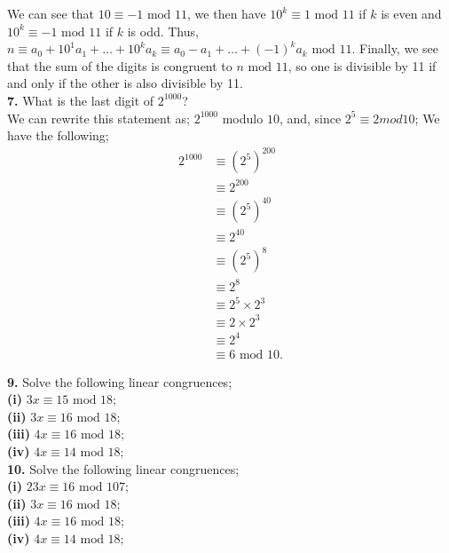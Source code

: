 \documentclass[paper=letter, fontsize=11pt]{scrartcl} %
\begin{document}
We can see that $10 \equiv -1 \text{ mod } 11$, we then have $10^k \equiv 1 \text{ mod } 11$
if $k$ is even and $10^k \equiv -1 \text{ mod } 11$ if $k$ is odd.
Thus, $n \equiv a_0 + 10^1 a_1 + \dots + 10^k a_k \equiv a_0 - a_1 + \dots + (-1)^k a_k 
\text{ mod } 11$.
Finally, we see that the sum of the digits is congruent to $n \text{ mod } 11$, so one is
divisible by 11 if and only if the other is also divisible by 11.
\\

\textbf{7.} What is the last digit of $2^{1000}$?
\\
We can rewrite this statement as; $2^1000$ modulo $10$, and, since $2^5 \equiv 2 mod 10$;
We have the following;
\begin{align*}
    2^1000 &\equiv (2^5)^{200} \\
    &\equiv 2^{200} \\
    &\equiv (2^5)^{40} \\
    &\equiv 2^{40} \\
    &\equiv (2^5)^8 \\
    &\equiv 2^8 \\
    &\equiv 2^5 \times 2^3 \\
    &\equiv 2 \times 2^3 \\
    &\equiv 2^4 \\
    &\equiv 6 \text{ mod } 10.
\end{align*}

\textbf{9.} Solve the following linear congruences; \\ 
\textbf{(i)} $3x \equiv 15 \text{ mod } 18;$ \\
\textbf{(ii)} $3x \equiv 16 \text{ mod } 18;$ \\
\textbf{(iii)} $4x \equiv 16 \text{ mod } 18;$ \\
\textbf{(iv)} $4x \equiv 14 \text{ mod } 18; $
\\

\textbf{10.} Solve the following linear congruences; \\ 
\textbf{(i)} $23x \equiv 16 \text{ mod } 107;$ \\
\textbf{(ii)} $3x \equiv 16 \text{ mod } 18;$ \\
\textbf{(iii)} $4x \equiv 16 \text{ mod } 18;$ \\
\textbf{(iv)} $4x \equiv 14 \text{ mod } 18; $
\\
\end{document}
